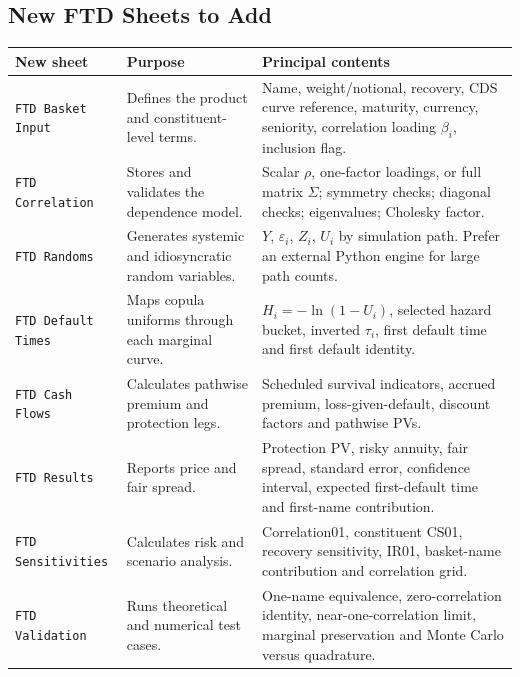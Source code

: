 \documentclass[11pt,a4paper]{article}
\begin{document}
\subsection{New FTD Sheets to Add}

\begin{longtable}{p{3.4cm}p{5.4cm}p{6.0cm}}
\toprule
\textbf{New sheet} & \textbf{Purpose} & \textbf{Principal contents} \\
\midrule
\endhead

\texttt{FTD Basket Input} &
Defines the product and constituent-level terms. &
Name, weight/notional, recovery, CDS curve reference, maturity, currency, seniority, correlation loading $\beta_i$, inclusion flag. \\

\texttt{FTD Correlation} &
Stores and validates the dependence model. &
Scalar $\rho$, one-factor loadings, or full matrix $\Sigma$; symmetry checks; diagonal checks; eigenvalues; Cholesky factor. \\

\texttt{FTD Randoms} &
Generates systemic and idiosyncratic random variables. &
$Y$, $\varepsilon_i$, $Z_i$, $U_i$ by simulation path. Prefer an external Python engine for large path counts. \\

\texttt{FTD Default Times} &
Maps copula uniforms through each marginal curve. &
$H_i=-\ln(1-U_i)$, selected hazard bucket, inverted $\tau_i$, first default time and first default identity. \\

\texttt{FTD Cash Flows} &
Calculates pathwise premium and protection legs. &
Scheduled survival indicators, accrued premium, loss-given-default, discount factors and pathwise PVs. \\

\texttt{FTD Results} &
Reports price and fair spread. &
Protection PV, risky annuity, fair spread, standard error, confidence interval, expected first-default time and first-name contribution. \\

\texttt{FTD Sensitivities} &
Calculates risk and scenario analysis. &
Correlation01, constituent CS01, recovery sensitivity, IR01, basket-name contribution and correlation grid. \\

\texttt{FTD Validation} &
Runs theoretical and numerical test cases. &
One-name equivalence, zero-correlation identity, near-one-correlation limit, marginal preservation and Monte Carlo versus quadrature. \\

\bottomrule
\end{longtable}
\end{document}
